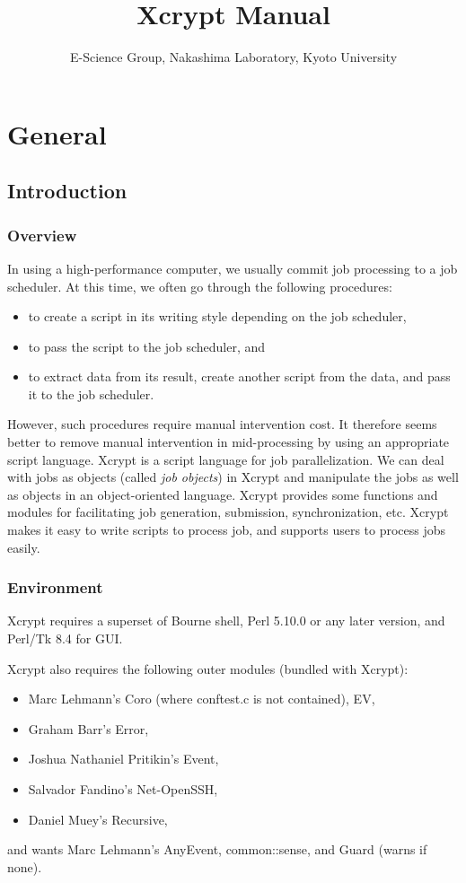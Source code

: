 \documentclass[a4paper,10pt]{report}
\title{Xcrypt Manual}
\author{E-Science Group, Nakashima Laboratory, Kyoto University}
\begin{document}
\maketitle
\tableofcontents

\part{General}
\chapter{Introduction}

\section{Overview}

In using a high-performance computer, we usually commit job processing
to a job scheduler.  At this time, we often go through the following
procedures:
\begin{itemize}
\item to create a script in its writing style depending on the
      job scheduler,
\item to pass the script to the job scheduler, and
\item to extract data from its result, create another script from
      the data, and pass it to the job scheduler.
\end{itemize}

However, such procedures require manual intervention cost.  It
therefore seems better to remove manual intervention in mid-processing
by using an appropriate script language.  Xcrypt is a script language
for job parallelization.  We can deal with jobs as objects (called
\textit{job objects}) in Xcrypt and manipulate the jobs as well as
objects in an object-oriented language.  Xcrypt provides some
functions and modules for facilitating job generation, submission,
synchronization, etc.  Xcrypt makes it easy to write scripts to process
job, and supports users to process jobs easily.

\section{Environment}

Xcrypt requires a superset of Bourne shell, Perl 5.10.0 or any later
version, and Perl/Tk 8.4 for GUI.

Xcrypt also requires the following outer modules (bundled with Xcrypt):
\begin{itemize}
\item Marc Lehmann's Coro (where conftest.c is not contained), EV,
\item Graham Barr's Error,
\item Joshua Nathaniel Pritikin's Event,
\item Salvador Fandino's Net-OpenSSH,
\item Daniel Muey's Recursive,
\end{itemize}
and wants Marc Lehmann's AnyEvent, common::sense, and Guard (warns if
none).
\end{document}
